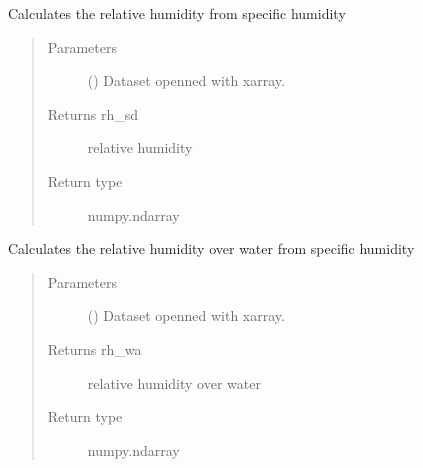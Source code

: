 \documentclass[a4paper,11pt,english]{sphinxmanual}
\begin{document}

\begin{fulllineitems}
\label{\detokenize{envlib:envlib.calc_altrv_vars.get_rh_sd}}
\sphinxAtStartPar
Calculates the relative humidity from specific humidity
\begin{quote}\begin{description}
\item[{Parameters}] \leavevmode
\sphinxAtStartPar
{} () \textendash{} Dataset openned with xarray.

\item[{Returns rh\_sd}] \leavevmode
\sphinxAtStartPar
relative humidity

\item[{Return type}] \leavevmode
\sphinxAtStartPar
numpy.ndarray

\end{description}\end{quote}

\end{fulllineitems}


\begin{fulllineitems}
\label{\detokenize{envlib:envlib.calc_altrv_vars.get_rh_wa}}
\sphinxAtStartPar
Calculates the relative humidity over water from specific humidity
\begin{quote}\begin{description}
\item[{Parameters}] \leavevmode
\sphinxAtStartPar
{} () \textendash{} Dataset openned with xarray.

\item[{Returns rh\_wa}] \leavevmode
\sphinxAtStartPar
relative humidity over water

\item[{Return type}] \leavevmode
\sphinxAtStartPar
numpy.ndarray

\end{description}\end{quote}

\end{fulllineitems}
\end{document}
